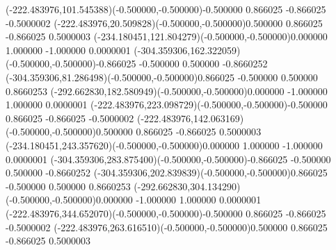\fontsize{12.000000}{14.400000}\selectfont
\ASYalignT(-222.483976,101.545388)(-0.500000,-0.500000){-0.500000 0.866025 -0.866025 -0.500000}{2}%
\color{ASYcolor}
\fontsize{12.000000}{14.400000}\selectfont
\ASYalignT(-222.483976,20.509828)(-0.500000,-0.500000){0.500000 0.866025 -0.866025 0.500000}{3}%
\color{ASYcolor}
\fontsize{12.000000}{14.400000}\selectfont
\ASYalignT(-234.180451,121.804279)(-0.500000,-0.500000){0.000000 1.000000 -1.000000 0.000000}{1}%
\color{ASYcolor}
\fontsize{12.000000}{14.400000}\selectfont
\ASYalignT(-304.359306,162.322059)(-0.500000,-0.500000){-0.866025 -0.500000 0.500000 -0.866025}{2}%
\color{ASYcolor}
\fontsize{12.000000}{14.400000}\selectfont
\ASYalignT(-304.359306,81.286498)(-0.500000,-0.500000){0.866025 -0.500000 0.500000 0.866025}{3}%
\color{ASYcolor}
\fontsize{12.000000}{14.400000}\selectfont
\ASYalignT(-292.662830,182.580949)(-0.500000,-0.500000){0.000000 -1.000000 1.000000 0.000000}{1}%
\color{ASYcolor}
\fontsize{12.000000}{14.400000}\selectfont
\ASYalignT(-222.483976,223.098729)(-0.500000,-0.500000){-0.500000 0.866025 -0.866025 -0.500000}{2}%
\color{ASYcolor}
\fontsize{12.000000}{14.400000}\selectfont
\ASYalignT(-222.483976,142.063169)(-0.500000,-0.500000){0.500000 0.866025 -0.866025 0.500000}{3}%
\color{ASYcolor}
\fontsize{12.000000}{14.400000}\selectfont
\ASYalignT(-234.180451,243.357620)(-0.500000,-0.500000){0.000000 1.000000 -1.000000 0.000000}{1}%
\color{ASYcolor}
\fontsize{12.000000}{14.400000}\selectfont
\ASYalignT(-304.359306,283.875400)(-0.500000,-0.500000){-0.866025 -0.500000 0.500000 -0.866025}{2}%
\color{ASYcolor}
\fontsize{12.000000}{14.400000}\selectfont
\ASYalignT(-304.359306,202.839839)(-0.500000,-0.500000){0.866025 -0.500000 0.500000 0.866025}{3}%
\color{ASYcolor}
\fontsize{12.000000}{14.400000}\selectfont
\ASYalignT(-292.662830,304.134290)(-0.500000,-0.500000){0.000000 -1.000000 1.000000 0.000000}{1}%
\color{ASYcolor}
\fontsize{12.000000}{14.400000}\selectfont
\ASYalignT(-222.483976,344.652070)(-0.500000,-0.500000){-0.500000 0.866025 -0.866025 -0.500000}{2}%
\color{ASYcolor}
\fontsize{12.000000}{14.400000}\selectfont
\ASYalignT(-222.483976,263.616510)(-0.500000,-0.500000){0.500000 0.866025 -0.866025 0.500000}{3}%

